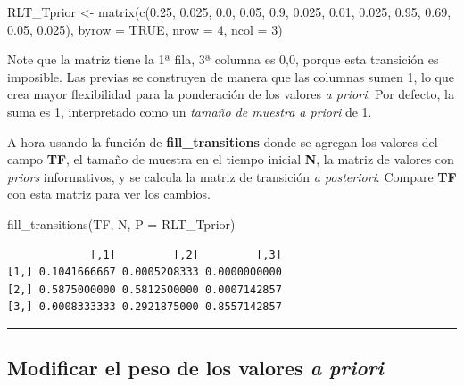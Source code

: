 \documentclass[
  12pt,
  letterpaper,
]{book}
\newenvironment{Shaded}{\begin{snugshade}}{\end{snugshade}}
\newcommand{\AttributeTok}[1]{\textcolor[rgb]{0.40,0.45,0.13}{#1}}
\newcommand{\ConstantTok}[1]{\textcolor[rgb]{0.56,0.35,0.01}{#1}}
\newcommand{\DecValTok}[1]{\textcolor[rgb]{0.68,0.00,0.00}{#1}}
\newcommand{\FloatTok}[1]{\textcolor[rgb]{0.68,0.00,0.00}{#1}}
\newcommand{\FunctionTok}[1]{\textcolor[rgb]{0.28,0.35,0.67}{#1}}
\newcommand{\NormalTok}[1]{\textcolor[rgb]{0.00,0.23,0.31}{#1}}
\newcommand{\OtherTok}[1]{\textcolor[rgb]{0.00,0.23,0.31}{#1}}
\begin{document}
\begin{Shaded}
\begin{Highlighting}[]
\NormalTok{RLT\_Tprior }\OtherTok{\textless{}{-}} \FunctionTok{matrix}\NormalTok{(}\FunctionTok{c}\NormalTok{(}\FloatTok{0.25}\NormalTok{, }\FloatTok{0.025}\NormalTok{, }\FloatTok{0.0}\NormalTok{,}
                       \FloatTok{0.05}\NormalTok{, }\FloatTok{0.9}\NormalTok{,   }\FloatTok{0.025}\NormalTok{,}
                       \FloatTok{0.01}\NormalTok{, }\FloatTok{0.025}\NormalTok{, }\FloatTok{0.95}\NormalTok{,}
                       \FloatTok{0.69}\NormalTok{, }\FloatTok{0.05}\NormalTok{,  }\FloatTok{0.025}\NormalTok{), }
                       \AttributeTok{byrow =} \ConstantTok{TRUE}\NormalTok{, }\AttributeTok{nrow =} \DecValTok{4}\NormalTok{, }\AttributeTok{ncol =} \DecValTok{3}\NormalTok{)}
\end{Highlighting}
\end{Shaded}

Note que la matriz tiene la 1ª fila, 3ª columna es 0,0, porque esta
transición es imposible. Las previas se construyen de manera que las
columnas sumen 1, lo que crea mayor flexibilidad para la ponderación de
los valores \emph{a priori}. Por defecto, la suma es 1, interpretado
como un \emph{tamaño de muestra a priori} de 1.

A hora usando la función de \textbf{fill\_transitions} donde se agregan
los valores del campo \textbf{TF}, el tamaño de muestra en el tiempo
inicial \textbf{N}, la matriz de valores con \emph{priors} informativos,
y se calcula la matriz de transición \emph{a posteriori}. Compare
\textbf{TF} con esta matriz para ver los cambios.

\begin{Shaded}
\begin{Highlighting}[]
\FunctionTok{fill\_transitions}\NormalTok{(TF, N, }\AttributeTok{P =}\NormalTok{ RLT\_Tprior)}
\end{Highlighting}
\end{Shaded}

\begin{verbatim}
             [,1]         [,2]         [,3]
[1,] 0.1041666667 0.0005208333 0.0000000000
[2,] 0.5875000000 0.5812500000 0.0007142857
[3,] 0.0008333333 0.2921875000 0.8557142857
\end{verbatim}

\begin{center}\rule{0.5\linewidth}{0.5pt}\end{center}

\subsection{\texorpdfstring{Modificar el peso de los valores \emph{a
priori}}{Modificar el peso de los valores a priori}}\label{modificar-el-peso-de-los-valores-a-priori}
\end{document}
